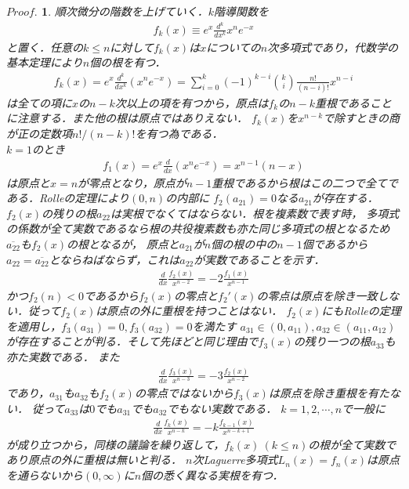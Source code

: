 \documentclass[a4j,papersize,disablejfam,slide,14pt]{jsarticle}
\newtheorem{Proof}{$Proof.$}
\newcommand{\qed}{%
	\relax\ifmmode
		\eqno{%
		\setlength{\fboxsep}{2pt}\setlength{\fboxrule}{0.3pt}
		\fcolorbox{black}{black}{\rule[2pt]{0pt}{1ex}}}
	\else
		\begingroup
		\setlength{\fboxsep}{2pt}\setlength{\fboxrule}{0.3pt}
		\hfill\fcolorbox{black}{black}{\rule[2pt]{0pt}{1ex}}
		\endgroup
	\fi}
\def\exp#1{e^{#1}} %
\begin{document}
    \begin{Proof}
            順次微分の階数を上げていく．$k$階導関数を
        \begin{align}
                f_k(x) \equiv \exp{x}\frac{d^k}{dx^k} x^n\exp{-x}
        \end{align}
        と置く．任意の$k \leq n$に対して$f_k(x)$は$x$についての$n$次多項式であり，代数学の基本定理により$n$個の根を有つ．
        \begin{align}
                f_k(x) = \exp{x}\frac{d^k}{dx^k}(x^n\exp{-x}) = \sum_{i=0}^{k}(-1)^{k-i} \binom{k}{i} \frac{n!}{(n-i)!} x^{n-i}
        \end{align}
        は全ての項に$x$の$n-k$次以上の項を有つから，原点は$f_k$の$n-k$重根であることに注意する．また他の根は原点ではありえない．
        $f_k(x)$を$x^{n-k}$で除すときの商が正の定数項$n!/(n-k)!$を有つ為である．\\
        $k=1$のとき
            \begin{align}
                f_1(x) = \exp{x}\frac{d}{dx}(x^n\exp{-x}) = x^{n-1}(n-x)
        \end{align}
        は原点と$x=n$が零点となり，原点が$n-1$重根であるから根はこの二つで全てである．{\rm Rolle}の定理により$(0, n)$の内部に
        $f_2(a_{21}) = 0$なる$a_{21}$が存在する．$f_2(x)$の残りの根$a_{22}$は実根でなくてはならない．根を複素数で表す時，
        多項式の係数が全て実数であるなら根の共役複素数も亦た同じ多項式の根となるため$\overline{a_{22}}$も$f_2(x)$の根となるが，
        原点と$a_{21}$が$n$個の根の中の$n-1$個であるから$a_{22} = \overline{a_{22}}$とならねばならず，これは$a_{22}$が実数であることを示す．
        \begin{align}
                \frac{d}{dx}\frac{f_2(x)}{x^{n-2}}=-2\frac{f_1(x)}{x^{n-1}}
        \end{align}
        かつ$f_2(n) < 0$であるから$f_2(x)$の零点と$f_2'(x)$の零点は原点を除き一致しない．従って$f_2(x)$は原点の外に重根を持つことはない．
        $f_2(x)$にも{\rm Rolle}の定理を適用し，$f_3(a_{31})=0, f_3(a_{32})=0$を満たす
        $a_{31}\in (0, a_{11}), a_{32} \in (a_{11}, a_{12})$が存在することが判る．そして先ほどと同じ理由で$f_3(x)$の残り一つの根$a_{33}$も亦た実数である．
        また
        \begin{align}
                \frac{d}{dx}\frac{f_3(x)}{x^{n-3}}=-3\frac{f_2(x)}{x^{n-2}}
        \end{align}
        であり，$a_{31}$も$a_{32}$も$f_2(x)$の零点ではないから$f_3(x)$は原点を除き重根を有たない．
        従って$a_{33}$は$0$でも$a_{31}$でも$a_{32}$でもない実数である．
        $k=1,2,\cdots,n$で一般に
        \begin{align}
                \frac{d}{dx}\frac{f_k(x)}{x^{n-k}}=-k\frac{f_{k-1}(x)}{x^{n-k+1}}
        \end{align}
        が成り立つから，同様の議論を繰り返して，$f_k(x)\ (k \leq n)$の根が全て実数であり原点の外に重根は無いと判る．
        $n$次{\rm Laguerre}多項式$L_n(x) = f_n(x)$は原点を通らないから$(0, \infty)$に$n$個の悉く異なる実根を有つ．\qed
    \end{Proof}
    
\end{document}
